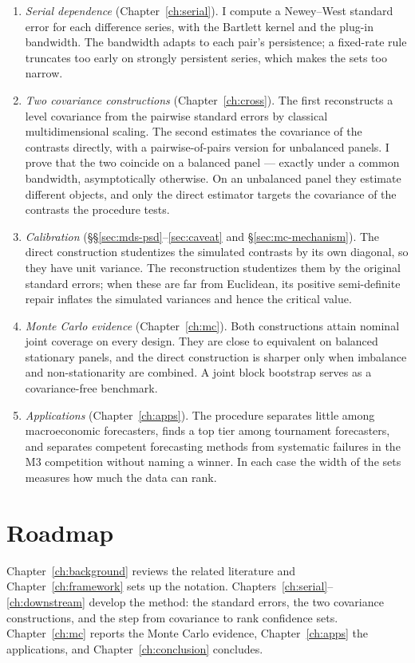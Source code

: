 \begin{enumerate}[nosep]
  \item \emph{Serial dependence} (Chapter~\ref{ch:serial}). I compute a Newey--West
  standard error for each difference series, with the Bartlett kernel and the
  \citet{andrews1991} plug-in bandwidth. The bandwidth adapts to each pair's
  persistence; a fixed-rate rule truncates too early on strongly persistent series,
  which makes the sets too narrow.
  \item \emph{Two covariance constructions} (Chapter~\ref{ch:cross}). The first
  reconstructs a level covariance from the pairwise standard errors by classical
  multidimensional scaling. The second estimates the covariance of the contrasts
  directly, with a pairwise-of-pairs version for unbalanced panels. I prove that the two
  coincide on a balanced panel --- exactly under a common bandwidth, asymptotically
  otherwise. On an unbalanced panel they estimate different objects, and only the direct
  estimator targets the covariance of the contrasts the procedure tests.
  \item \emph{Calibration} (\S\S\ref{sec:mds-psd}--\ref{sec:caveat} and
  \S\ref{sec:mc-mechanism}). The direct construction studentizes the simulated contrasts
  by its own diagonal, so they have unit variance. The reconstruction studentizes them by
  the original standard errors; when these are far from Euclidean, its positive
  semi-definite repair inflates the simulated variances and hence the critical value.
  \item \emph{Monte Carlo evidence} (Chapter~\ref{ch:mc}). Both constructions attain
  nominal joint coverage on every design. They are close to equivalent on balanced
  stationary panels, and the direct construction is sharper only when imbalance and
  non-stationarity are combined. A joint block bootstrap serves as a covariance-free
  benchmark.
  \item \emph{Applications} (Chapter~\ref{ch:apps}). The procedure separates little among
  macroeconomic forecasters, finds a top tier among tournament forecasters, and separates
  competent forecasting methods from systematic failures in the M3 competition without
  naming a winner. In each case the width of the sets measures how much the data can
  rank.
\end{enumerate}

\section{Roadmap}
\label{sec:intro-roadmap}

Chapter~\ref{ch:background} reviews the related literature and Chapter~\ref{ch:framework}
sets up the notation. Chapters~\ref{ch:serial}--\ref{ch:downstream} develop the method:
the standard errors, the two covariance constructions, and the step from covariance to
rank confidence sets. Chapter~\ref{ch:mc} reports the Monte Carlo evidence,
Chapter~\ref{ch:apps} the applications, and Chapter~\ref{ch:conclusion} concludes.
